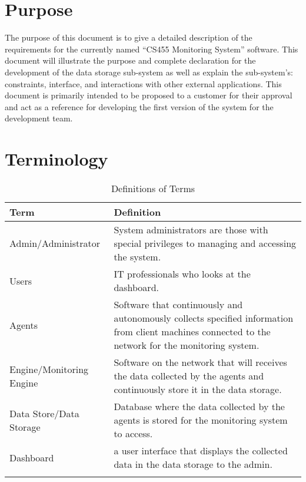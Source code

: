 \documentclass[letterpaper,12pt,oneside,listof=totoc]{scrreprt}
\begin{document}
\section{Purpose} %
The purpose of this document is to give a detailed description of the requirements for the currently named “CS455 Monitoring System” software. This document will illustrate the purpose and complete declaration for the development of the data storage sub-system as well as explain the sub-system's: constraints, interface, and interactions with other external applications. This document is primarily intended to be proposed to a customer for their approval and act as a reference for developing the first version of the system for the development team.

\newpage
\section{Terminology}
\begin{longtable}{| p{} | p{} |} 
    \hline
   \textbf{ Term} & \textbf{Definition}\\
    \hline
    Admin/Administrator & System administrators are those with special privileges to managing and accessing the system. \\ 
    \hline
    Users & IT professionals who looks at the dashboard. \\
    \hline
    Agents & Software that continuously and autonomously collects specified information from client machines connected to the network for the monitoring system.\\ 
    \hline
    Engine/Monitoring Engine & Software on the network that will receives the data collected by the agents and continuously store it in the data storage. \\ 
    \hline
    Data Store/Data Storage & Database where the data collected by the agents is stored for the monitoring system to access. \\ 
    \hline
    Dashboard & a user interface that displays the collected data in the data storage to the admin.\\ 
    \hline
\caption{Definitions of Terms}
\end{longtable}

\newpage
\end{document}
